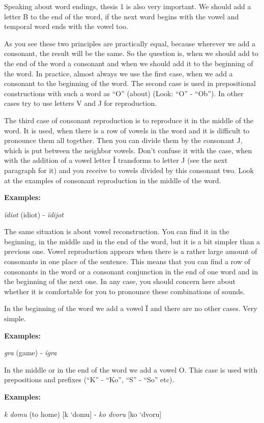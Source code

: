 Speaking about word endings, thesis 1 is also very important. We should add a letter B to the end of the word, if the next word begins with the vowel and temporal word ends with the vowel too.

As you see these two principles are practically equal, because wherever we add a consonant, the result will be the same. So the question is, when we should add to the end of the word a consonant and when we should add it to the beginning of the word. In practice, almost always we use the first case, when we add a consonant to the beginning of the word. The second case is used in prepositional constructions with such a word as “O” (about) (Look: “O” - “Ob”). In other cases try to use letters V and J for reproduction.

The third case of consonant reproduction is to reproduce it in the middle of the word. It is used, when there is a row of vowels in the word and it is difficult to pronounce them all together. Then you can divide them by the consonant J, which is put between the neighbor vowels. Don’t confuse it with the case, when with the addition of a vowel letter Ǐ transforms to letter J (see the next paragraph for it) and you receive to vowels divided by this consonant two. Look at the examples of consonant reproduction in the middle of the word.

\textbf{Examples:}

\textit{ïdiot} (idiot) \textipa{[idI’ot]} - \textit{ïdijot} 

The same situation is about vowel reconstruction. You can find it in the beginning, in the middle and in the end of the word, but it is a bit simpler than a previous one. Vowel reproduction appears when there is a rather large amount of consonants in one place of the sentence. This means that you can find a row of consonants in the word or a consonant conjunction in the end of one word and in the beginning of the next one. In any case, you should concern here about whether it is comfortable for you to pronounce these combinations of sounds.

In the beginning of the word we add a vowel Ï and there are no other cases. Very simple.

\textbf{Examples:}

\textit{gra} (game) \textipa{[Hra]} - \textit{ïgra} \textipa{[i’Hra]}

In the middle or in the end of the word we add a vowel O. This case is used with prepositions and prefixes (“K” - “Ko”, “S” - “So” etc). 

\textbf{Examples:}

\textit{k domu} (to home) [k ‘domu] - \textit{ko dvoru} [ko ‘dvoru]




